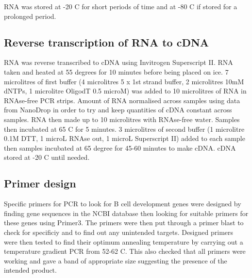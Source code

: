 RNA was stored at -20 \textdegree C for short periods of time and at -80 \textdegree C if stored for a prolonged period.


\subsection{Reverse transcription of RNA to cDNA}

RNA was reverse transcribed to cDNA using Invitrogen Superscript II.
RNA taken and heated at 55 degrees for 10 minutes before being placed on ice.
7 microlitres of first buffer (4 microlitres 5 x 1st strand buffer, 2 microlitres 10mM dNTPs, 1 microlitre OligodT 0.5 microM) was added to 10 microlitres of RNA in RNAse-free PCR strips.
Amount of RNA normalised across samples using data from NanoDrop in order to try and keep quantities of cDNA constant across samples.
RNA then made up to 10 microlitres with RNAse-free water.
Samples then incubated at 65 \textdegree C for 5 minutes.
3 microlitres of second buffer (1 microlitre 0.1M DTT, 1 microL RNAse out, 1 microL Superscript II) added to each sample then samples incubated at 65 degree for 45-60 minutes to make cDNA.
cDNA stored at -20 \textdegree C until needed.

\subsection{Primer design}

Specific primers for PCR to look for B cell development genes were designed by finding gene sequences in the NCBI database then looking for suitable primers for these genes using Primer3.
The primers were then put through a primer blast to check for specificiy and to find out any unintended targets.
Designed primers were then tested to find their optimum annealing temperature by carrying out a temperature gradient PCR from 52-62 \textdegree C.
This also checked that all primers were working and gave a band of appropriate size suggesting the presence of the intended product.

